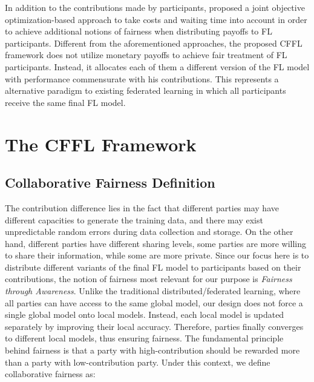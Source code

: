 \documentclass{article}
\begin{document}
In addition to the contributions made by participants, \cite{Yu-et-al:2020AIES} proposed a joint objective optimization-based approach to take costs and waiting time into account in order to achieve additional notions of fairness when distributing payoffs to FL participants. Different from the aforementioned approaches, the proposed CFFL framework does not utilize monetary payoffs to achieve fair treatment of FL participants. Instead, it allocates each of them a different version of the FL model with performance commensurate with his contributions. This represents a alternative paradigm to existing federated learning in which all participants receive the same final FL model.

\section{The CFFL Framework}
\label{sec:CFFL}
\subsection{Collaborative Fairness Definition}
The contribution difference lies in the fact that different parties may have different capacities to generate the training data, and there may exist unpredictable random errors during data collection and storage. On the other hand, different parties have different sharing levels, some parties are more willing to share their information, while some are more private. 
Since our focus here is to distribute different variants of the final FL model to participants based on their contributions, the notion of fairness most relevant for our purpose is \textit{Fairness through Awareness}. %
Unlike the traditional distributed/federated learning, where all parties can have access to the same global model, our design does not force a single global model onto local models. Instead, each local model is updated separately by improving their local accuracy. Therefore, parties finally converges to different local models, thus ensuring fairness. %
The fundamental principle behind fairness is that a party with high-contribution should be rewarded more than a party with low-contribution party. Under this context, we define collaborative fairness as:
\end{document}
